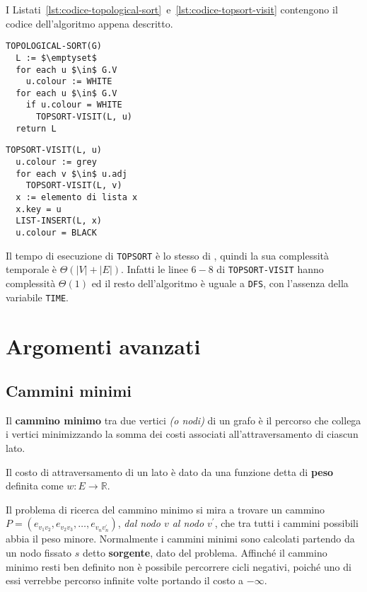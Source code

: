 \documentclass[italian, 10pt]{article}
\begin{document}
\bigskip
I Listati~\ref{lst:codice-topological-sort}~e~\ref{lst:codice-topsort-visit} contengono il codice dell'algoritmo appena descritto.

\begin{minipage}[t]{0.495\textwidth}
  \begin{lstlisting}[style=pseudocode, caption={Algoritmo \texttt{TOPOLOGICAL-SORT}}, label={lst:codice-topological-sort}]
TOPOLOGICAL-SORT(G)
  L := $\emptyset$
  for each u $\in$ G.V
    u.colour := WHITE
  for each u $\in$ G.V
    if u.colour = WHITE
      TOPSORT-VISIT(L, u)
  return L
  \end{lstlisting}
\end{minipage}
\begin{minipage}[t]{0.495\textwidth}
  \begin{lstlisting}[style=pseudocode, caption={Algoritmo \texttt{TOPSORT-VISIT}}, label={lst:codice-topsort-visit}]
TOPSORT-VISIT(L, u)
  u.colour := grey
  for each v $\in$ u.adj
    TOPSORT-VISIT(L, v)
  x := elemento di lista x
  x.key = u
  LIST-INSERT(L, x)
  u.colour = BLACK
  \end{lstlisting}
\end{minipage}

Il tempo di esecuzione di \texttt{TOPSORT} è lo stesso di \DFS, quindi la sua complessità temporale è \(\Theta(|V|+|E|)\).
Infatti le linee \(6-8\) di \texttt{TOPSORT-VISIT} hanno complessità \(\Theta(1)\) ed il resto dell'algoritmo è uguale a \texttt{DFS}, con l'assenza della variabile \texttt{TIME}.

\clearpage

\section{Argomenti avanzati}

\subsection{Cammini minimi}

Il \textbf{cammino minimo} tra due vertici \textit{(o nodi)} di un grafo è il percorso che collega i vertici minimizzando la somma dei costi associati all'attraversamento di ciascun lato.

Il costo di attraversamento di un lato è dato da una funzione detta di \textbf{peso} definita come \(w: E \rightarrow \mathbb{R}\).

Il problema di ricerca del cammino minimo si mira a trovare un cammino \(P = (e_{v_1 v_2},e_{v_2 v_3},\ldots, e_{v_n v_n^\prime} )\), \textit{dal nodo \(v\) al nodo \(v^\prime\)}, che tra tutti i cammini possibili abbia il peso minore.
Normalmente i cammini minimi sono calcolati partendo da un nodo fissato \(s\) detto \textbf{sorgente}, dato del problema.
Affinché il cammino minimo resti ben definito non è possibile percorrere cicli negativi, poiché uno di essi verrebbe percorso infinite volte portando il costo a \(-\infty\).
\end{document}
